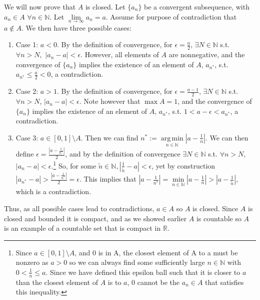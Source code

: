 \documentclass[11pt]{article} %
\DeclareMathOperator*{\argmin}{arg\,min}
\begin{document}
We will now prove that $A$ is closed. Let $\{ a_n \}$ be a convergent subsequence, with $a_n \in A$ $\forall n \in \mathbb{N}$. Let $\lim\limits_{n\rightarrow \infty} a_n = a$. Assume for purpose of contradiction that $a \notin A$. We then have three possible cases:
\begin{enumerate}
\item Case 1: $a<0$. By the definition of convergence, for $\epsilon = \frac{a}{2}$, $\exists N \in \mathbb{N}$ s.t. $\forall n>N,$ $|a_n - a|<\epsilon.$ However, all elements of $A$ are nonnegative, and the convergence of $\{a_n\}$ implies the existence of an element of $A$, $a_{n^*}$, s.t. $a_{n^*}\leq \frac{a}{2}<0$, a contradiction.
\item Case 2: $a>1$.  By the definition of convergence, for $\epsilon = \frac{a-1}{2}$, $\exists N \in \mathbb{N}$ s.t. $\forall n>N$, $|a_n - a|<\epsilon.$ Note however that $\max A =1$, and the convergence of $\{a_n\}$ implies the existence of an element of $A$, $a_{n^*}$, s.t. $1<a-\epsilon<a_{n^*}$, a contradiction.
\item Case 3: $a \in [0,1]\setminus A$. Then we can find $n^*:= \argmin\limits_{n \in \mathbb{N}} |a - \frac{1}{n}|$. We can then define $\epsilon = \frac{|a - \frac{1}{n^*}|}{2}$, and by the definition of convergence $\exists N \in \mathbb{N}$ s.t. $\forall n>N,$ $|a_n - a|<\epsilon$.\footnote{Since $a \in [0,1] \setminus A$, and 0 is in A, the closest element of A to a must be nonzero as $a>0$ so we can always find some sufficiently large $n\in \mathbb{N}$ with $0<\frac{1}{n}\leq a$. Since we have defined this epsilon ball such that it is closer to $a$ than the closest element of $A$ is to $a$, 0 cannot be the $a_n \in A$ that satisfies this inequality.} So, for some $\tilde{n} \in \mathbb{N}, |\frac{1}{\tilde{n}} -a|<\epsilon$, yet by construction $|a_{n^*} - a|>\frac{|a - \frac{1}{n^*}|}{2}=\epsilon$. This implies that $|a - \frac{1}{n^*}| = \min\limits_{n \in \mathbb{N}} |a - \frac{1}{n}| > |a - \frac{1}{\tilde{n}}|$, which is a contradiction. %
\end{enumerate}
Thus, as all possible cases lead to contradictions, $a \in A$ so $A$ is closed. Since $A$ is closed and bounded it is compact, and as we showed earlier $A$ is countable so $A$ is an example of a countable set that is compact in $\mathbb{R}$.
%
%
\end{document}
